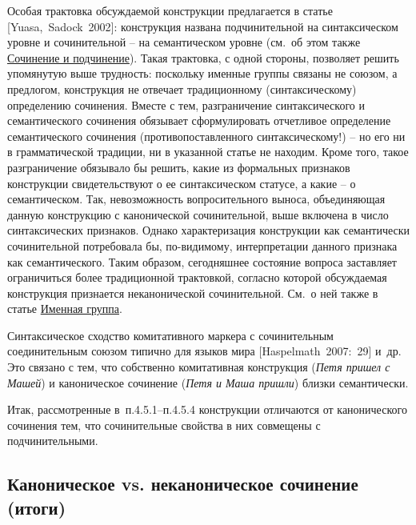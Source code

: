Особая трактовка обсуждаемой конструкции предлагается в статье
{[}Yuasa,~Sadock~2002{]}: конструкция названа подчинительной на
синтаксическом уровне и сочинительной -- на семантическом уровне (см.~об
этом также \underline{Сочинение и подчинение}). Такая трактовка, с одной
стороны, позволяет решить упомянутую выше трудность: поскольку именные
группы связаны не союзом, а предлогом, конструкция не отвечает
традиционному (синтаксическому) определению сочинения. Вместе с тем,
разграничение синтаксического и семантического сочинения обязывает
сформулировать отчетливое определение семантического сочинения
(противопоставленного синтаксическому!) -- но его ни в грамматической
традиции, ни в указанной статье не находим. Кроме того, такое
разграничение обязывало бы решить, какие из формальных признаков
конструкции свидетельствуют о ее синтаксическом статусе, а какие -- о
семантическом. Так, невозможность вопросительного выноса, объединяющая
данную конструкцию с канонической сочинительной, выше включена в число
синтаксических признаков. Однако характеризация конструкции как
семантически сочинительной потребовала бы, по-видимому, интерпретации
данного признака как семантического. Таким образом, сегодняшнее
состояние вопроса заставляет ограничиться более традиционной трактовкой,
согласно которой обсуждаемая конструкция признается неканонической
сочинительной. См.~о ней также в статье \underline{Именная группа}.

Синтаксическое сходство комитативного маркера с сочинительным
соединительным союзом типично для языков мира {[}Haspelmath~2007:~29{]}
и~др. Это связано с тем, что собственно комитативная конструкция
(\emph{Петя пришел с Машей}) и каноническое сочинение (\emph{Петя и Маша
пришли}) близки семантически.

Итак, рассмотренные в~п.4.5.1--п.4.5.4 конструкции отличаются от
канонического сочинения тем, что сочинительные свойства в них совмещены
с подчинительными.

\hypertarget{ux43aux430ux43dux43eux43dux438ux447ux435ux441ux43aux43eux435-vs.-ux43dux435ux43aux430ux43dux43eux43dux438ux447ux435ux441ux43aux43eux435-ux441ux43eux447ux438ux43dux435ux43dux438ux435-ux438ux442ux43eux433ux438}{%
\subsection{Каноническое vs. неканоническое сочинение
(итоги)}\label{ux43aux430ux43dux43eux43dux438ux447ux435ux441ux43aux43eux435-vs.-ux43dux435ux43aux430ux43dux43eux43dux438ux447ux435ux441ux43aux43eux435-ux441ux43eux447ux438ux43dux435ux43dux438ux435-ux438ux442ux43eux433ux438}}

